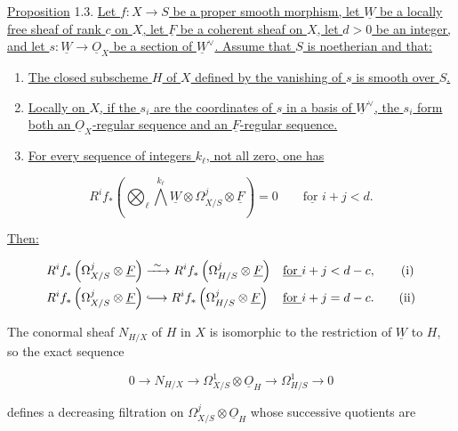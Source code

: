 
\underline{Proposition} 1.3. \underline{Let $f:X\to S$ be a proper smooth
morphism, let $\underline W$ be a locally free sheaf of rank $c$ on $X$,
let $\underline F$ be a coherent sheaf on $X$, let $d>0$ be an integer,
and let $s:\underline W\to\underline O_X$ be a section of
$\underline W^\vee$.  Assume that $S$ is noetherian and that:}

\begin{enumerate}[label=(\alph*),leftmargin=2.4em]
\item \underline{The closed subscheme $H$ of $X$ defined by the vanishing
of $s$ is smooth over $S$.}

\item \underline{Locally on $X$, if the $s_i$ are the coordinates of $s$
in a basis of $\underline W^\vee$, the $s_i$ form both an
$\underline O_X$-regular sequence and an $\underline F$-regular sequence.}

\item \underline{For every sequence of integers $k_\ell$, not all zero,
one has}
\end{enumerate}

\begin{equation*}
R^if_*\left(\bigotimes_\ell\bigwedge^{k_\ell}\underline W
\otimes\Omega^j_{X/S}\otimes\underline F\right)=0
\qquad\underline{\text{for }}i+j<d.
\end{equation*}

\underline{Then:}

\begin{align*}
R^if_*\left(\Omega^j_{X/S}\otimes\underline F\right)
&\xrightarrow{\ \sim\ }
R^if_*\left(\Omega^j_{H/S}\otimes\underline F\right)
&&\underline{\text{for }}i+j<d-c, \tag{i}\\
R^if_*\left(\Omega^j_{X/S}\otimes\underline F\right)
&\lhook\joinrel\longrightarrow
R^if_*\left(\Omega^j_{H/S}\otimes\underline F\right)
&&\underline{\text{for }}i+j=d-c. \tag{ii}
\end{align*}

The conormal sheaf $N_{H/X}$ of $H$ in $X$ is isomorphic to the restriction
of $\underline W$ to $H$, so the exact sequence

\begin{equation}\tag{1.3.1}
0\longrightarrow N_{H/X}\longrightarrow
\Omega^1_{X/S}\otimes\underline O_H\longrightarrow
\Omega^1_{H/S}\longrightarrow0
\end{equation}

defines a decreasing filtration on
$\Omega^j_{X/S}\otimes\underline O_H$ whose successive quotients are

